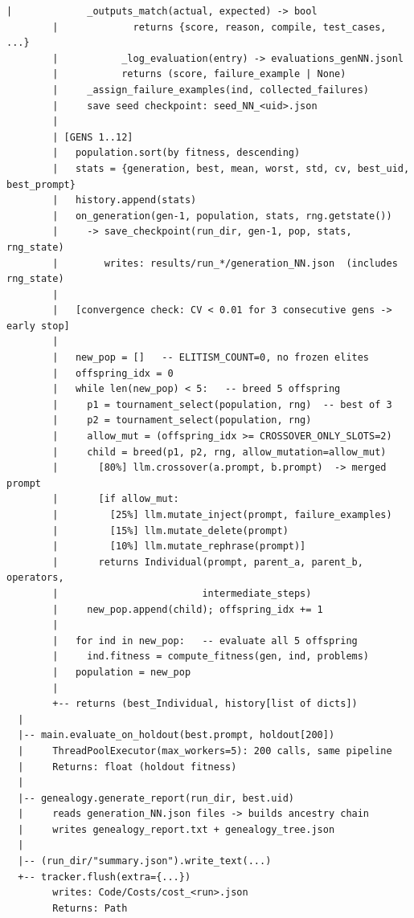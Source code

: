 \documentclass[11pt,a4paper]{report}
\begin{document}
\begin{lstlisting}[style=chain, caption={Complete call tree for one GA run.}]
        |             _outputs_match(actual, expected) -> bool
        |             returns {score, reason, compile, test_cases, ...}
        |           _log_evaluation(entry) -> evaluations_genNN.jsonl
        |           returns (score, failure_example | None)
        |     _assign_failure_examples(ind, collected_failures)
        |     save seed checkpoint: seed_NN_<uid>.json
        |
        | [GENS 1..12]
        |   population.sort(by fitness, descending)
        |   stats = {generation, best, mean, worst, std, cv, best_uid, best_prompt}
        |   history.append(stats)
        |   on_generation(gen-1, population, stats, rng.getstate())
        |     -> save_checkpoint(run_dir, gen-1, pop, stats, rng_state)
        |        writes: results/run_*/generation_NN.json  (includes rng_state)
        |
        |   [convergence check: CV < 0.01 for 3 consecutive gens -> early stop]
        |
        |   new_pop = []   -- ELITISM_COUNT=0, no frozen elites
        |   offspring_idx = 0
        |   while len(new_pop) < 5:   -- breed 5 offspring
        |     p1 = tournament_select(population, rng)  -- best of 3
        |     p2 = tournament_select(population, rng)
        |     allow_mut = (offspring_idx >= CROSSOVER_ONLY_SLOTS=2)
        |     child = breed(p1, p2, rng, allow_mutation=allow_mut)
        |       [80%] llm.crossover(a.prompt, b.prompt)  -> merged prompt
        |       [if allow_mut:
        |         [25%] llm.mutate_inject(prompt, failure_examples)
        |         [15%] llm.mutate_delete(prompt)
        |         [10%] llm.mutate_rephrase(prompt)]
        |       returns Individual(prompt, parent_a, parent_b, operators,
        |                         intermediate_steps)
        |     new_pop.append(child); offspring_idx += 1
        |
        |   for ind in new_pop:   -- evaluate all 5 offspring
        |     ind.fitness = compute_fitness(gen, ind, problems)
        |   population = new_pop
        |
        +-- returns (best_Individual, history[list of dicts])
  |
  |-- main.evaluate_on_holdout(best.prompt, holdout[200])
  |     ThreadPoolExecutor(max_workers=5): 200 calls, same pipeline
  |     Returns: float (holdout fitness)
  |
  |-- genealogy.generate_report(run_dir, best.uid)
  |     reads generation_NN.json files -> builds ancestry chain
  |     writes genealogy_report.txt + genealogy_tree.json
  |
  |-- (run_dir/"summary.json").write_text(...)
  +-- tracker.flush(extra={...})
        writes: Code/Costs/cost_<run>.json
        Returns: Path
\end{lstlisting}
\end{document}
